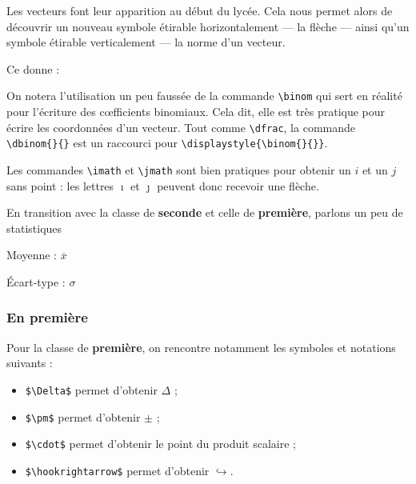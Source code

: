 Les vecteurs font leur apparition au début du lycée. Cela nous permet alors de découvrir un nouveau symbole étirable horizontalement --- la flèche --- ainsi qu'un symbole étirable verticalement --- la norme d'un vecteur.


Ce  donne :



On notera l'utilisation un peu faussée de la commande \texttt{\textbackslash binom} qui sert en réalité pour l'écriture des c{\oe}fficients binomiaux. Cela dit, elle est très pratique pour écrire les coordonnées d'un vecteur. Tout comme \texttt{\textbackslash dfrac}, la commande \verb!\dbinom{}{}! est un raccourci pour \verb!\displaystyle{\binom{}{}}!.

\begin{info}
    Les commandes \texttt{\textbackslash imath} et \texttt{\textbackslash jmath} sont bien pratiques pour obtenir un $i$ et un $j$ sans point : les lettres $\imath$ et $\jmath$ peuvent donc recevoir une flèche.
\end{info}

En transition avec la classe de \textbf{seconde} et celle de \textbf{première}, parlons un peu de statistiques \bigskip

{
\begin{SideBySideExample}
    Moyenne : $\overline{x}$\par
    \'Ecart-type : $\sigma$
\end{SideBySideExample}
}\bigskip

\subsubsection{En première}

Pour la classe de \textbf{première}, on rencontre notamment les symboles et notations suivants :

\begin{itemize}
    \item \verb!$\Delta$! permet d'obtenir $\Delta$ ;
    \item \verb!$\pm$! permet d'obtenir $\pm$ ;
    \item \verb!$\cdot$! permet d'obtenir le point du produit scalaire ;
    \item \verb!$\hookrightarrow$! permet d'obtenir $\hookrightarrow$.
\end{itemize}

